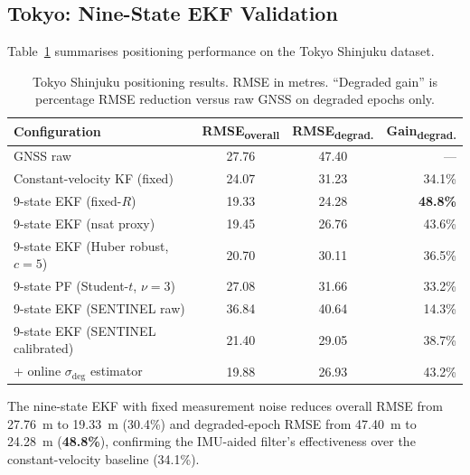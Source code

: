 \documentclass[journal]{IEEEtran}
\newcommand{\sigdeg}{\sigma_{\mathrm{deg}}}
\begin{document}
\subsection{Tokyo: Nine-State EKF Validation}
\label{subsec:tokyo_results}

Table~\ref{tab:tokyo_results} summarises positioning performance on the
Tokyo Shinjuku dataset.

\begin{table}[h]
\caption{Tokyo Shinjuku positioning results. RMSE in metres.
  ``Degraded gain'' is percentage RMSE reduction versus raw GNSS
  on degraded epochs only.}
\label{tab:tokyo_results}
\begin{tabular}{@{}lccr@{}}
\toprule
Configuration              & RMSE\textsubscript{overall} &
  RMSE\textsubscript{degrad.} & Gain\textsubscript{degrad.} \\
\midrule
GNSS raw                            & 27.76 & 47.40 & --- \\
Constant-velocity KF (fixed)        & 24.07 & 31.23 & 34.1\% \\
9-state EKF (fixed-$R$)             & 19.33 & 24.28 & \textbf{48.8\%} \\
9-state EKF (nsat proxy)            & 19.45 & 26.76 & 43.6\% \\
9-state EKF (Huber robust, $c{=}5$) & 20.70 & 30.11 & 36.5\% \\
9-state PF (Student-$t$, $\nu{=}3$) & 27.08 & 31.66 & 33.2\% \\
9-state EKF (SENTINEL raw)          & 36.84 & 40.64 & 14.3\% \\
9-state EKF (SENTINEL calibrated)   & 21.40 & 29.05 & 38.7\% \\
\;+ online $\sigdeg$ estimator      & 19.88 & 26.93 & 43.2\% \\
\bottomrule
\end{tabular}
\end{table}

The nine-state EKF with fixed measurement noise reduces overall RMSE from
27.76~m to 19.33~m (30.4\%) and degraded-epoch RMSE from 47.40~m to 24.28~m
(\textbf{48.8\%}), confirming the IMU-aided filter's effectiveness over the
constant-velocity baseline (34.1\%).
\end{document}
